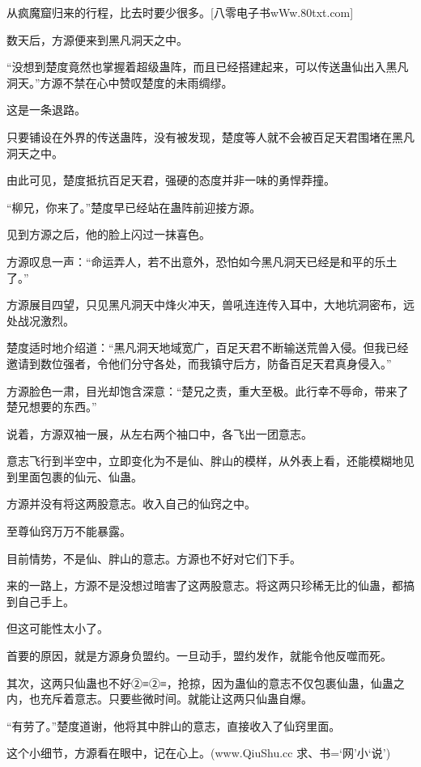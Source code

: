 
\begin{this_body}

从疯魔窟归来的行程，比去时要少很多。[八零电子书wWw.80txt.com]

数天后，方源便来到黑凡洞天之中。

“没想到楚度竟然也掌握着超级蛊阵，而且已经搭建起来，可以传送蛊仙出入黑凡洞天。”方源不禁在心中赞叹楚度的未雨绸缪。

这是一条退路。

只要铺设在外界的传送蛊阵，没有被发现，楚度等人就不会被百足天君围堵在黑凡洞天之中。

由此可见，楚度抵抗百足天君，强硬的态度并非一味的勇悍莽撞。

“柳兄，你来了。”楚度早已经站在蛊阵前迎接方源。

见到方源之后，他的脸上闪过一抹喜色。

方源叹息一声：“命运弄人，若不出意外，恐怕如今黑凡洞天已经是和平的乐土了。”

方源展目四望，只见黑凡洞天中烽火冲天，兽吼连连传入耳中，大地坑洞密布，远处战况激烈。

楚度适时地介绍道：“黑凡洞天地域宽广，百足天君不断输送荒兽入侵。但我已经邀请到数位强者，令他们分守各处，而我镇守后方，防备百足天君真身侵入。”

方源脸色一肃，目光却饱含深意：“楚兄之责，重大至极。此行幸不辱命，带来了楚兄想要的东西。”

说着，方源双袖一展，从左右两个袖口中，各飞出一团意志。

意志飞行到半空中，立即变化为不是仙、胖山的模样，从外表上看，还能模糊地见到里面包裹的仙元、仙蛊。

方源并没有将这两股意志。收入自己的仙窍之中。

至尊仙窍万万不能暴露。

目前情势，不是仙、胖山的意志。方源也不好对它们下手。

来的一路上，方源不是没想过暗害了这两股意志。将这两只珍稀无比的仙蛊，都搞到自己手上。

但这可能性太小了。

首要的原因，就是方源身负盟约。一旦动手，盟约发作，就能令他反噬而死。

其次，这两只仙蛊也不好②≡②≡，抢掠，因为蛊仙的意志不仅包裹仙蛊，仙蛊之内，也充斥着意志。只要些微时间。就能让这两只仙蛊自爆。

“有劳了。”楚度道谢，他将其中胖山的意志，直接收入了仙窍里面。

这个小细节，方源看在眼中，记在心上。(www.QiuShu.cc 求、书=‘网’小‘说’)


\end{this_body}
